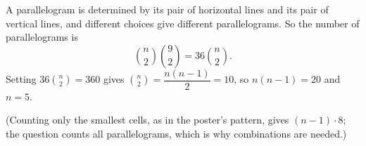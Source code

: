 A parallelogram is determined by its pair of horizontal lines and its pair of vertical lines, and different choices give different parallelograms. So the number of parallelograms is
\[
\binom n2\binom92=36\binom n2 .
\]
Setting $36\binom n2=360$ gives $\binom n2=\dfrac{n(n-1)}{2}=10$, so $n(n-1)=20$ and $n=\boxed{5}$.

(Counting only the smallest cells, as in the poster's pattern, gives $(n-1)\cdot8$; the question counts all parallelograms, which is why combinations are needed.)
